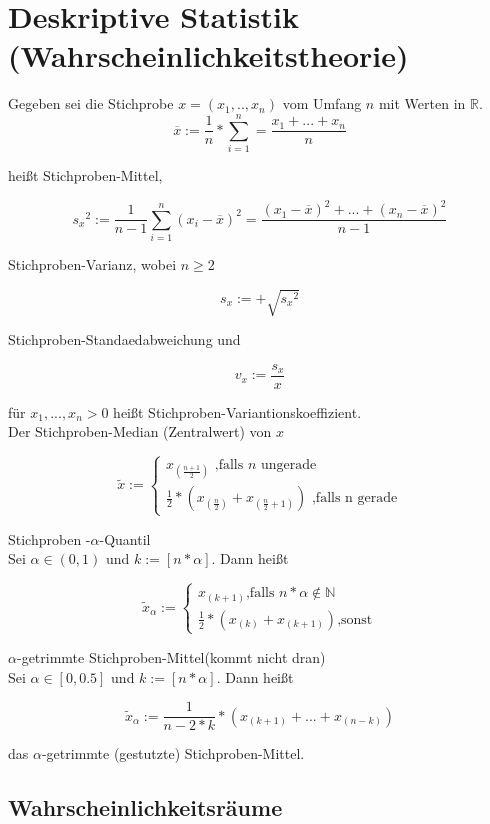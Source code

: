 \section{Deskriptive Statistik (Wahrscheinlichkeitstheorie)}

Gegeben sei die Stichprobe $x=(x_1,..,x_n)$ vom Umfang $n$ mit Werten in $\mathbb{R}$.
\[\overline{x}:= \frac{1}{n}*\sum_{i = 1}^{n}=\frac{x_1+...+x_n}{n}     \]

heißt Stichproben-Mittel,

\[{s_x}^2:=\frac{1}{n-1}\sum_{i=1}^{n}(x_i-\overline{x})^2   =\frac{(x_1-\overline{x})^2+...+(x_n-\overline{x})^2}{n-1}\]

Stichproben-Varianz, wobei $n\geq 2$

\[s_x := +\sqrt{{s_x}^2} \]

Stichproben-Standaedabweichung und

\[v_x := \frac{s_x}{x} \]

für $x_1,...,x_n >0 $ heißt Stichproben-Variantionskoeffizient.\\

Der Stichproben-Median (Zentralwert) von $x$

\[\tilde{x} :=\begin{cases}x_{(\frac{n+1}{2})}\textrm{    ,falls $n$ ungerade}\\
    \frac{1}{2}*(x_{(\frac{n}{2})}+x_{(\frac{n}{2}+1)})\textrm{ ,falls n gerade}\end{cases}\]

Stichproben -$\alpha$-Quantil\\

Sei $\alpha \in (0,1)$ und $k:=[n*\alpha]$. Dann heißt

\[\tilde{x}_\alpha  :=\begin{cases}x_{(k+1)}\textrm{,falls $n*\alpha \notin \mathbb{N} $}\\
    \frac{1}{2}*(x_{(k)}+x_{(k+1)})\textrm{,sonst}\end{cases}\]


$\alpha$-getrimmte Stichproben-Mittel(kommt nicht dran)\\

Sei $\alpha \in [0,0.5]$ und $k:=[n*\alpha ]$. Dann heißt

\[\tilde{x}_\alpha := \frac{1}{n-2*k}*(x_{(k+1)}+...+x_{(n-k)}) \]

das $\alpha $-getrimmte (gestutzte) Stichproben-Mittel.


\subsection{Wahrscheinlichkeitsräume}

